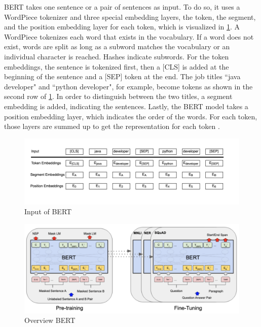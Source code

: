 \documentclass[12pt, a4paper, titlepage]{article}
\begin{document}
\ac{BERT} takes one sentence or a pair of sentences as input. To do so, it uses a WordPiece tokenizer and three special embedding layers, the token, the segment, and the position embedding layer for each token, which is visualized in \ref{fig: F4}. A WordPiece tokenizes each word that exists in the vocabulary. If a word does not exist, words are split as long as a subword matches the vocabulary or an individual character is reached. Hashes indicate subwords. For the token embeddings, the sentence is tokenized first, then a [CLS] is added at the beginning of the sentence and a [SEP] token at the end. The job titles ``java developer" and ``python developer", for example, become tokens as shown in the second row of \ref{fig: F4}. In order to distinguish between the two titles, a segment embedding is added, indicating the sentences. Lastly, the \ac{BERT} model takes a position embedding layer, which indicates the order of the words. For each token, those layers are summed up to get the representation for each token \citep{devlin2018,ravichandiran2021}.

\begin{figure}[hb!]
  \center
  \includegraphics[scale=0.8]{BERTInput_own.png}
  \caption[Input of BERT]{\label{fig: F4} Input of BERT \citep[5]{devlin2018}}
\end{figure}

\begin{figure}[hb!]
  \center
  \includegraphics[scale=0.5]{BERTOverview.png}
  \caption[Overview BERT]{\label{fig: F3} Overview BERT \citep[3]{devlin2018}}
\end{figure}
\end{document}
